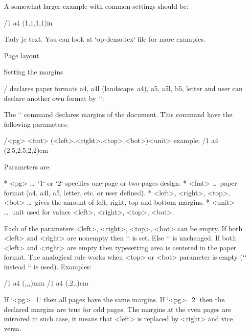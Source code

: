 A somewhat larger example with common settings should be:

\begtt
\fontfam[Termes]   %
\typosize[11/13]   %
\margins/1 a4 (1,1,1,1)in   %
\cslang            %

Tady je text.
\bye
\endtt
%
You can look at `op-demo.tex` file for more examples.


\sec Page layout

\secc Setting the margins

\OpTeX/ declares paper formats a4, a4l (landscape~a4), a5, a5l, b5, letter and
user can declare another own format by `\sdef`:

\begtt
{} 
\endtt

The `\margins` command declares margins of the document. This command have
the following parameters:

\begtt
\margins/<pg> <fmt> (<left>,<right>,<top>,<bot>)<unit>
  example:
\margins/1 a4 (2.5,2.5,2,2)cm
\endtt

Parameters are:

\begitems
* <pg> \dots\ `1` or `2` specifies one-page or two-pages design.
* <fmt> \dots\ paper format (a4, a4l, a5, letter, etc. or user defined).
* <left>, <right>, <top>, <bot> \dots\ gives the amount of left, right,
      top and bottom margins.
* <unit> \dots\ unit used for values <left>, <right>, <top>, <bot>.
\enditems

Each of the parameters <left>, <right>, <top>, <bot> can be empty.
If both <left> and <right> are nonempty then `\hsize` is set. Else `\hsize`
is unchanged. If both <left> and <right> are empty then typesetting area is
centered in the paper format. The analogical rule works when <top> or <bot>
parameter is empty (`\vsize` instead `\hsize` is used). Examples:

\begtt
\margins/1 a4 (,,,)mm   %
\margins/1 a4 (,2,,)cm  %
\endtt

If `<pg>=1` then all pages have the same margins. If `<pg>=2` then the
declared margins are true for odd pages. The margins at the even pages are
mirrored in such case, it means that <left> is replaced by <right> and vice
versa.

